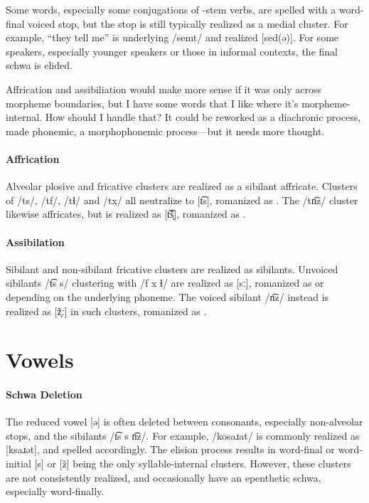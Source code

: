 Some words, especially some conjugations of -stem verbs, are spelled with a word-final voiced stop, but the stop is still typically realized as a medial cluster. For example,  “they tell me” is underlying /semt/ and realized [sed(ə)]. For some speakers, especially younger speakers or those in informal contexts, the final schwa is elided.

\begin{kaobox}[frametitle=\sc todo:]
Affrication and assibiliation would make more sense if it was only across morpheme boundaries, but I have some words that I like where it's morpheme-internal. How should I handle that? It could be reworked as a diachronic process, made phonemic, a morphophonemic process---but it needs more thought.
\end{kaobox}

\paragraph{Affrication}
Alveolar plosive and fricative clusters are realized as a sibilant affricate. Clusters of /ts/, /tf/, /tɬ/ and /tx/ all neutralize to [t͡s], romanized as . The /tn͡z/ cluster likewise affricates, but is realized as [t͡s̞̃], romanized as . 

\paragraph{Assibilation}
Sibilant and non-sibilant fricative clusters are realized as sibilants. Unvoiced sibilants /t͡s s/ clustering with /f x ɬ/ are realized as [sː], romanized as  or  depending on the underlying phoneme. The voiced sibilant /n͡z/ instead is realized as [z̞̃ː] in such clusters, romanized as .

\section{Vowels}
\paragraph{Schwa Deletion}
The reduced vowel [ə] is often deleted between consonants, especially non-alveolar stops, and the sibilants /t͡s s n͡z/. For example,  /kosaɹat/ is commonly realized as [ksaɹət], and spelled accordingly. The elision process results in word-final or word-initial [s] or [z̃] being the only syllable-internal clusters. However, these clusters are not consistently realized, and occasionally have an epenthetic schwa, especially word-finally. 


